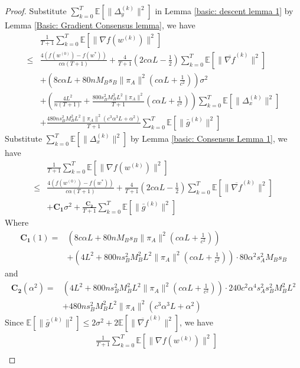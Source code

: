 \documentclass{article}
\newcommand{\EE}[1]{\mathbb{E}\left[#1\right]}
\newcommand{\norm}[1]{\| #1 \|}
\begin{document}
\begin{proof}
  Substitute $\sum_{k=0}^T\EE{\norm{\Delta_{y}^{(k)}}^2}$ in Lemma \ref{basic: descent lemma 1} by Lemma \ref{Basic: Gradient Consensus lemma}, we have
  \begin{align*}
    &\frac{1}{T+1}\sum_{k=0}^T\EE{\norm{\nabla f(w^{(k)})}^2}\\ 
  \leq & \frac{4(f(w^{(0)})-f(w^{*}))}{c\alpha(T+1)}+\frac{4}{T+1}\left(2c\alpha L-\frac{1}{2}\right)\sum_{k=0}^T\EE{\norm{\overline{\nabla f}^{(k)}}^2}\\&+\left(8c\alpha L+80nM_Bs_B\norm{\pi_A}^2(c\alpha L +\frac{1}{c^2})\right)\sigma^2\\&+\left(\frac{ 4L^2}{n(T+1)}+\frac{800s_B^2M_B^2L^2\norm{\pi_A}^2}{T+1}(c\alpha L+\frac{1}{c^2})\right)\sum_{k=0}^T\EE{\norm{\Delta_x^{(k)}}^2}\\&+\frac{480ns_B^2M_B^2L^2\norm{\pi_A}^2(c^3\alpha^3 L + \alpha^2)}{T+1}\sum_{k=0}^T\EE{\norm{\bar{g}^{(k)}}^2}
  \end{align*}
  Substitute $\sum_{k=0}^T\EE{\norm{\Delta_{x}^{(k)}}^2}$ by Lemma \ref{basic: Consensus Lemma 1}, we have
  \begin{align*}
    &\frac{1}{T+1}\sum_{k=0}^T\EE{\norm{\nabla f(w^{(k)})}^2}\\ 
  \leq & \frac{4(f(w^{(0)})-f(w^{*}))}{c\alpha(T+1)}+\frac{4}{T+1}\left(2c\alpha L-\frac{1}{2}\right)\sum_{k=0}^T\EE{\norm{\overline{\nabla f}^{(k)}}^2}\\&+\mathbf{C_1}\sigma^2+\frac{\mathbf{C_2}}{T+1}\sum_{k=0}^T\EE{\norm{\bar{g}^{(k)}}^2}
  \end{align*}
  Where 
  \begin{align*}
    \mathbf{C_1}(1)=&\left(8c\alpha L+80nM_Bs_B\norm{\pi_A}^2(c\alpha L +\frac{1}{c^2})\right)\\&+\left(4L^2+800ns_B^2M_B^2L^2\norm{\pi_A}^2(c\alpha L+\frac{1}{c^2})\right)\cdot 80\alpha^2s_A^2M_Bs_B
  \end{align*}
  and
  \begin{align*}
    \mathbf{C_2}(\alpha^2)=&\left(4L^2+800ns_B^2M_B^2L^2\norm{\pi_A}^2(c\alpha L+\frac{1}{c^2})\right)\cdot 240c^2\alpha^4s_A^2s_B^2M_B^2L^2\\&+480ns_B^2M_B^2L^2\norm{\pi_A}^2(c^3\alpha^3 L + \alpha^2)
  \end{align*}
  Since $\EE{\norm{\bar{g}^{(k)}}^2}\leq 2\sigma^2+2\EE{\norm{\overline{\nabla f}^{(k)}}^2}$, we have 
  \begin{align*}
    &\frac{1}{T+1}\sum_{k=0}^T\EE{\norm{\nabla f(w^{(k)})}^2}\\ 

\end{align*}
\end{proof}
\end{document}
